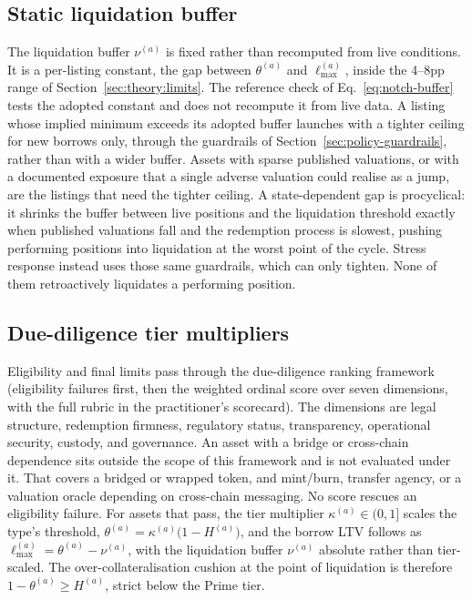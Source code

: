 \subsection{Static liquidation buffer}\label{sec:policy-notch}
The liquidation buffer $\nu^{(a)}$ is fixed rather than recomputed from live conditions. It is a per-listing constant, the gap between $\theta^{(a)}$ and $\ell_{\max}^{(a)}$, inside the 4--8pp range of Section~\ref{sec:theory:limits}. The reference check of Eq.~\eqref{eq:notch-buffer} tests the adopted constant and does not recompute it from live data. A listing whose implied minimum exceeds its adopted buffer launches with a tighter ceiling for new borrows only, through the guardrails of Section~\ref{sec:policy-guardrails}, rather than with a wider buffer. Assets with sparse published valuations, or with a documented exposure that a single adverse valuation could realise as a jump, are the listings that need the tighter ceiling. A state-dependent gap is procyclical: it shrinks the buffer between live positions and the liquidation threshold exactly when published valuations fall and the redemption process is slowest, pushing performing positions into liquidation at the worst point of the cycle. Stress response instead uses those same guardrails, which can only tighten. None of them retroactively liquidates a performing position.

\subsection{Due-diligence tier multipliers}\label{sec:policy-tiers}
Eligibility and final limits pass through the due-diligence ranking framework (eligibility failures first, then the weighted ordinal score over seven dimensions, with the full rubric in the practitioner's scorecard). The dimensions are legal structure, redemption firmness, regulatory status, transparency, operational security, custody, and governance. An asset with a bridge or cross-chain dependence sits outside the scope of this framework and is not evaluated under it. That covers a bridged or wrapped token, and mint/burn, transfer agency, or a valuation oracle depending on cross-chain messaging. No score rescues an eligibility failure. For assets that pass, the tier multiplier $\kappa^{(a)} \in (0,1]$ scales the type's threshold, $\theta^{(a)} = \kappa^{(a)}\bigl(1-H^{(a)}\bigr)$, and the borrow LTV follows as $\ell_{\max}^{(a)} = \theta^{(a)} - \nu^{(a)}$, with the liquidation buffer $\nu^{(a)}$ absolute rather than tier-scaled. The over-collateralisation cushion at the point of liquidation is therefore $1-\theta^{(a)} \ge H^{(a)}$, strict below the Prime tier.

